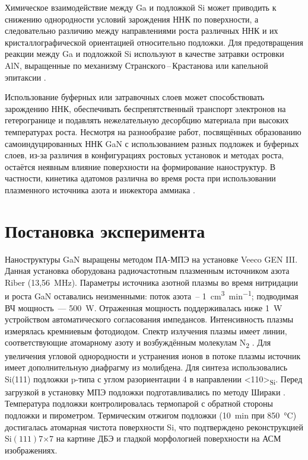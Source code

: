 Химическое взаимодействие между Ga и подложкой Si может приводить к снижению
однородности условий зарождения ННК по поверхности, а следовательно различию
между направлениями роста различных ННК и их кристаллографической ориентацией
относительно подложки. Для предотвращения реакции между Ga и подложкой Si
используют в качестве затравки островки AlN, выращенные по механизму
Странского\,--\,Крастанова \cite{Songmuang2007} или капельной эпитаксии \cite{Bolshakov2018}.

Использование буферных или затравочных слоев может способствовать зарождению
ННК, обеспечивать беспрепятственный транспорт электронов на гетерогранице и
подавлять нежелательную десорбцию материала при высоких температурах роста.
Несмотря на разнообразие работ, посвящённых образованию самоиндуцированных ННК
GaN с использованием разных подложек и буферных слоев, из-за различия в
конфигурациях ростовых установок и методах роста, остаётся неявным влияние
поверхности на формирование наноструктур. В частности, кинетика адатомов
различна во время роста при использовании плазменного источника азота и
инжектора аммиака \cite{Kawaharazuka2010}.

\section{Постановка эксперимента}\label{sec:ch3/sec1}

Наноструктуры GaN выращены методом ПА-МПЭ на установке Veeco GEN III. Данная
установка оборудована радиочастотным плазменным источником азота Riber
(13,56~\si{\mega\hertz}). Параметры источника азотной плазмы во время
нитридации и роста GaN оставались неизменными: поток азота~--
1~\si{\centi\meter^3\per\minute}; подводимая ВЧ мощность~--- 500~\si{\watt}.
Отраженная мощность поддерживалась ниже 1~\si{\watt} устройством
автоматического согласования импедансов. Интенсивность плазмы измерялась
кремниевым фотодиодом. Спектр излучения плазмы имеет линии, соответствующие
атомарному азоту и возбуждённым молекулам N\textsubscript{2}
\cite{Debnath2016}. Для увеличения угловой однородности и устранения ионов в
потоке плазмы источник имеет дополнительную диафрагму из молибдена. Для синтеза
использовались Si(111) подложки p-типа с углом разориентации 4{\textdegree} в
направлении <110>\textsubscript{Si}. Перед загрузкой в установку МПЭ подложки
подготавливались по методу Шираки \cite{Ishizaka2019}. Температура подложки
контролировалась термопарой с обратной стороны подложки и пирометром.
Термическим отжигом подложки (10~\si{\minute} при 850~\si{\degreeCelsius})
достигалась атомарная чистота поверхности Si, что подтверждено реконструкцией
Si\((111)7\)\(\times\)\(7\) на картине ДБЭ и гладкой морфологией поверхности на
АСМ изображениях.

